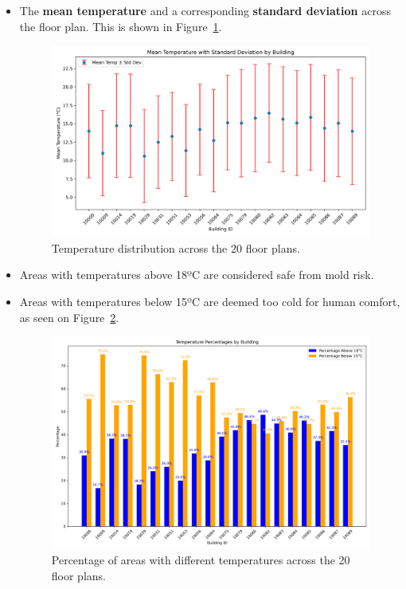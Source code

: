 \documentclass[a4paper,12pt]{article}
\begin{document}
\begin{itemize}
        \item The \textbf{mean temperature} and a corresponding \textbf{standard deviation} across the floor plan. This is shown in Figure~\ref{fig:temperature_distribution}.

        \begin{figure}[h!]
                \centering
                \includegraphics[width=1\textwidth]{Plots/mean_temp_with_std_dev.png}
                \caption{Temperature distribution across the 20 floor plans.}
                \label{fig:temperature_distribution}
        \end{figure}

        \item Areas with temperatures above 18ºC are considered safe from mold risk.
        \item Areas with temperatures below 15ºC are deemed too cold for human comfort, as seen on Figure~\ref{fig:temperature_distribution_precentage}.
        \begin{figure}[h!]
                \centering
                \includegraphics[width=1\textwidth]{Plots/temperature_percentages_by_building.png}
                \caption{Percentage of areas with different temperatures across the 20 floor plans.}
                \label{fig:temperature_distribution_precentage}
        \end{figure}

\end{itemize}
\end{document}
